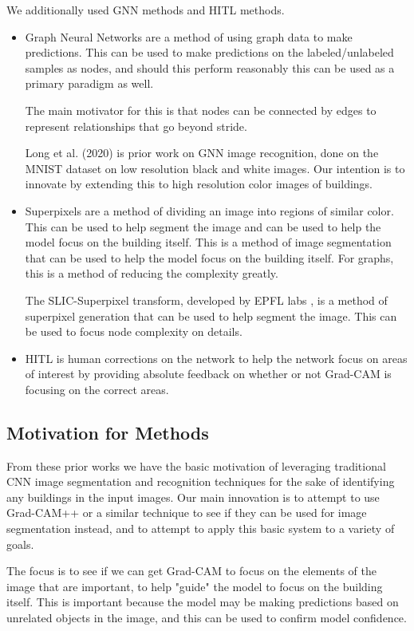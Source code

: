 \documentclass{article}
\begin{document}
We additionally used GNN methods and HITL methods. \begin{itemize}
    \item Graph Neural Networks are a method of using graph data to make predictions. This can be used to make predictions on the labeled/unlabeled samples as nodes, and should this perform reasonably this can be used as a primary paradigm as well. 
    
    The main motivator for this is that nodes can be connected by edges to represent relationships that go beyond stride.

    Long et al.\cite{long} (2020) is prior work on GNN image recognition, done on the MNIST dataset on low resolution black and white images. Our intention is to innovate by extending this to high resolution color images of buildings.

    \item Superpixels are a method of dividing an image into regions of similar color. This can be used to help segment the image and can be used to help the model focus on the building itself. This is a method of image segmentation that can be used to help the model focus on the building itself. For graphs, this is a method of reducing the complexity greatly. 

    The SLIC-Superpixel transform, developed by EPFL labs \cite{epflSLICSuperpixels}, is a method of superpixel generation that can be used to help segment the image. This can be used to focus node complexity on details.
    \item HITL is human corrections on the network to help the network focus on areas of interest by providing absolute feedback on whether or not Grad-CAM is focusing on the correct areas.
\end{itemize}

\subsection{Motivation for Methods}

From these prior works we have the basic motivation of leveraging traditional CNN image segmentation and recognition techniques for the sake of identifying any buildings in the input images. Our main innovation is to attempt to use Grad-CAM++ or a similar technique to see if they can be used for image segmentation instead, and to attempt to apply this basic system to a variety of goals.

The focus is to see if we can get Grad-CAM to focus on the elements of the image that are important, to help "guide" the model to focus on the building itself. This is important because the model may be making predictions based on unrelated objects in the image, and this can be used to confirm model confidence.
\end{document}
